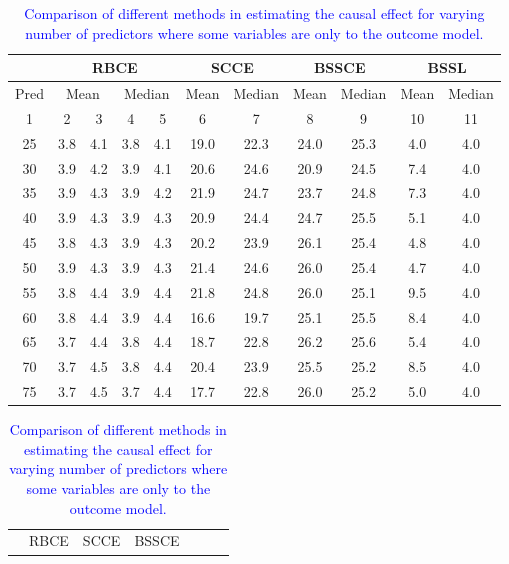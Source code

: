 \documentclass[preprint,12pt]{elsarticle}
\newcommand{\added}[1]{\textcolor{blue}{#1}}
\begin{document}
\begin{table}[h]
	\tiny
	\centering
	\caption{\added{Comparison of different methods in estimating the causal effect for varying number of predictors where some variables are only to the outcome model.}}
	\label{tab:causal2b}
	\begin{tabular}{c|cccc|cc|cc|cc}
		\hline
		\multicolumn{1}{c|}{}&
		\multicolumn{4}{c|}{RBCE}&
		\multicolumn{2}{c|}{SCCE}&
		\multicolumn{2}{c|}{BSSCE}&
		\multicolumn{2}{c}{BSSL}\\
		\hline
		\multicolumn{1}{c|}{Pred}&
		\multicolumn{2}{c}{Mean}&
		\multicolumn{2}{c|}{Median}&
		\multicolumn{1}{c}{Mean}&
		\multicolumn{1}{c|}{Median}&
		\multicolumn{1}{c}{Mean}&
		\multicolumn{1}{c|}{Median}&
		\multicolumn{1}{c}{Mean}&
		\multicolumn{1}{c}{Median}\\
		\hline
		1 & 2 & 3 & 4 & 5 & 6 & 7 & 8 & 9 & 10 & 11 \\ 
		\hline
		25 & 3.8 & 4.1 & 3.8 & 4.1 & 19.0 & 22.3 & 24.0 & 25.3 & 4.0 & 4.0 \\ 
		30 & 3.9 & 4.2 & 3.9 & 4.1 & 20.6 & 24.6 & 20.9 & 24.5 & 7.4 & 4.0 \\ 
		35 & 3.9 & 4.3 & 3.9 & 4.2 & 21.9 & 24.7 & 23.7 & 24.8 & 7.3 & 4.0 \\ 
		40 & 3.9 & 4.3 & 3.9 & 4.3 & 20.9 & 24.4 & 24.7 & 25.5 & 5.1 & 4.0 \\ 
		45 & 3.8 & 4.3 & 3.9 & 4.3 & 20.2 & 23.9 & 26.1 & 25.4 & 4.8 & 4.0 \\ 
		50 & 3.9 & 4.3 & 3.9 & 4.3 & 21.4 & 24.6 & 26.0 & 25.4 & 4.7 & 4.0 \\ 
		55 & 3.8 & 4.4 & 3.9 & 4.4 & 21.8 & 24.8 & 26.0 & 25.1 & 9.5 & 4.0 \\ 
		60 & 3.8 & 4.4 & 3.9 & 4.4 & 16.6 & 19.7 & 25.1 & 25.5 & 8.4 & 4.0 \\ 
		65 & 3.7 & 4.4 & 3.8 & 4.4 & 18.7 & 22.8 & 26.2 & 25.6 & 5.4 & 4.0 \\ 
		70 & 3.7 & 4.5 & 3.8 & 4.4 & 20.4 & 23.9 & 25.5 & 25.2 & 8.5 & 4.0 \\ 
		75 & 3.7 & 4.5 & 3.7 & 4.4 & 17.7 & 22.8 & 26.0 & 25.2 & 5.0 & 4.0 \\ 
		\hline
	\end{tabular}
	\begin{tabular}{c|rrrrr|rrr|rrr|rrr}
		\hline
		\multicolumn{1}{c|}{}&
		\multicolumn{5}{c|}{RBCE}&
		\multicolumn{3}{c|}{SCCE}&
		\multicolumn{3}{c|}{BSSCE}&

\end{tabular}
\end{table}
\end{document}
